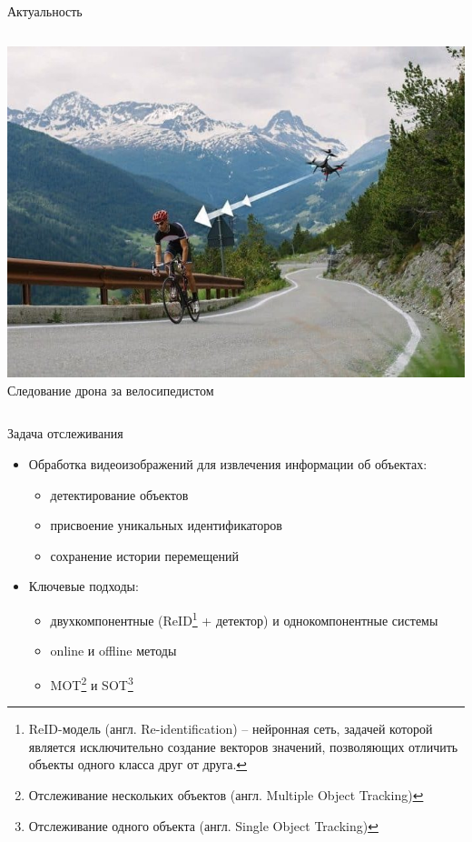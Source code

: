 \documentclass{beamer} %
\begin{document}
\begin{frame}{Актуальность}
\begin{columns}[t,onlytextwidth]
{        \vfill  %
        \centering
        \includegraphics[width=\linewidth,trim=0 30 0 9,clip]{presentation/drone.jpg}\\
        \small Следование дрона за велосипедистом
      }
  \end{columns}
\end{frame}



\begin{frame}{Задача отслеживания}
  \begin{itemize}
    \item Обработка видеоизображений для извлечения информации об объектах:
      \begin{itemize}
        \item детектирование объектов
        \item присвоение уникальных идентификаторов
        \item сохранение истории перемещений
      \end{itemize}
    \item Ключевые подходы:
      \begin{itemize}
        \item двухкомпонентные (ReID\footnote{ReID-модель (англ. Re-identification) -- нейронная сеть, задачей которой является исключительно создание векторов значений, позволяющих отличить объекты одного класса друг от друга.} + детектор) и однокомпонентные системы
        \item online и offline методы
        \item MOT\footnote{Отслеживание нескольких объектов (англ. Multiple Object Tracking)} и SOT\footnote{Отслеживание одного объекта (англ. Single Object Tracking)}
      \end{itemize}
  \end{itemize}
\end{frame}
\end{document}

